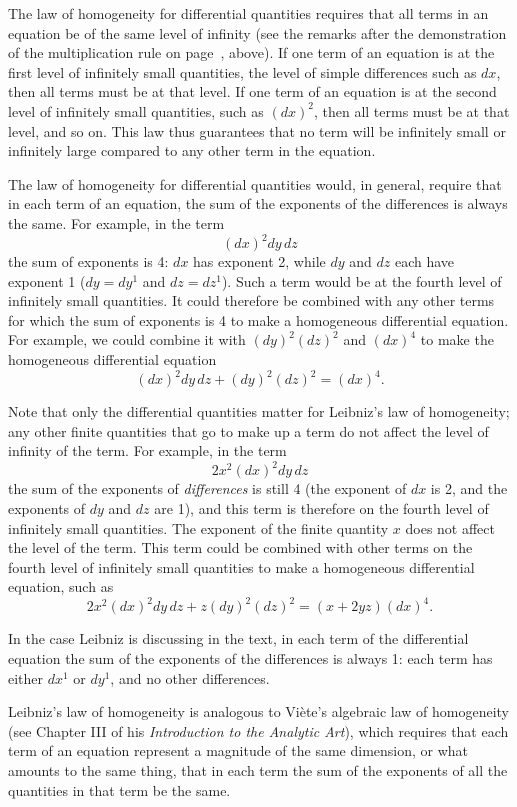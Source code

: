 \documentclass[twoside,openright]{article}
\begin{document}
The law of homogeneity for differential quantities requires that all
terms in an equation be of the same level of infinity (see the remarks
after the demonstration of the multiplication rule on
page~\pageref{levels}, above).  If one term of an equation is at the
first level of infinitely small quantities, the level of simple
differences such as $dx$, then all terms must be at that level.  If
one term of an equation is at the second level of infinitely small
quantities, such as $(dx)^2$, then all terms must be at that level,
and so on.  This law thus guarantees that no term will be infinitely
small or infinitely large compared to any other term in the equation.

The law of homogeneity for differential quantities would, in general,
require that in each term of an equation, the sum of the exponents of
the differences is always the same.  For example, in the term
$$(dx)^2dy\,dz$$
the sum of exponents is 4: $dx$ has exponent 2, while $dy$ and $dz$
each have exponent 1 ($dy = dy^1$ and $dz = dz^1$).  Such a term would
be at the fourth level of infinitely small quantities.  It could
therefore be combined with any other terms for which the sum of
exponents is 4 to make a homogeneous differential equation.  For
example, we could combine it with $(dy)^2(dz)^2$ and $(dx)^4$ to make
the homogeneous differential equation
$$(dx)^2dy\,dz  + (dy)^2(dz)^2 = (dx)^4.$$

Note that only the differential quantities matter for Leibniz's law of
homogeneity; any other finite quantities that go to make up a term do
not affect the level of infinity of the term.  For example, in the
term
$$2x^2(dx)^2dy\,dz$$
the sum of the exponents of {\em differences} is still 4 (the exponent
of $dx$ is 2, and the exponents of $dy$ and $dz$ are 1), and this term
is therefore on the fourth level of infinitely small quantities.  The
exponent of the finite quantity $x$ does not affect the level of the
term.  This term could be combined with other terms on the fourth
level of infinitely small quantities to make a homogeneous
differential equation, such as
$$2x^2(dx)^2dy\,dz + z(dy)^2(dz)^2 = (x + 2yz)(dx)^4.$$

In the case Leibniz is discussing in the text, in each term of the
differential equation the sum of the exponents of the differences is
always 1: each term has either $dx^1$ or $dy^1$, and no other
differences.

Leibniz's law of homogeneity is analogous to Vi\`{e}te's algebraic law
of homogeneity (see Chapter III of his {\em Introduction to the
  Analytic Art}), which requires that each term of an equation
represent a magnitude of the same dimension, or what amounts to the
same thing, that in each term the sum of the exponents of all the
quantities in that term be the same.
\end{document}
